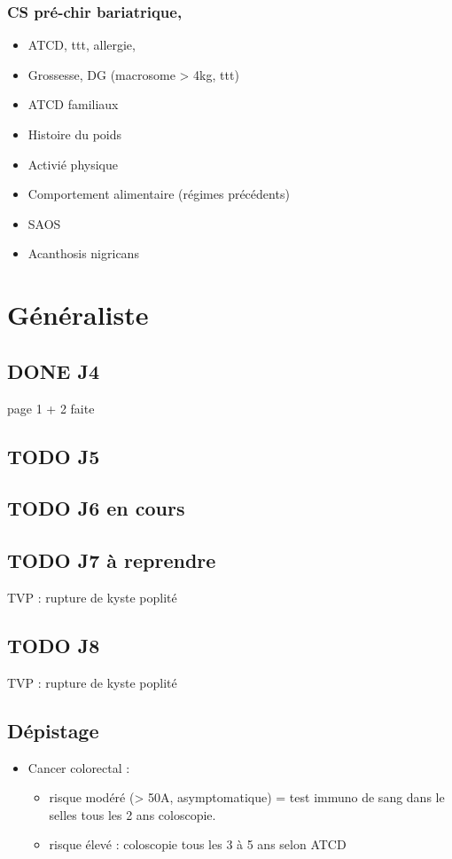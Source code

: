 \documentclass[11pt]{article}
\begin{document}
\subsubsection{CS pré-chir bariatrique,}
\label{sec:org0775185}
\begin{itemize}
\item ATCD, ttt, allergie,
\item Grossesse, DG (macrosome > 4kg, ttt)
\item ATCD familiaux
\item Histoire du poids
\item Activié physique
\item Comportement alimentaire (régimes précédents)
\item SAOS
\item Acanthosis nigricans
\end{itemize}
\section{Généraliste}
\label{sec:org47553ba}
\subsection{{\bfseries\sffamily DONE} J4}
\label{sec:orgdef581a}
page 1 + 2 faite
\subsection{{\bfseries\sffamily TODO} J5}
\label{sec:org888397b}
\subsection{{\bfseries\sffamily TODO} J6 en cours}
\label{sec:org81d060b}
\subsection{{\bfseries\sffamily TODO} J7  à reprendre}
\label{sec:org717eee4}
TVP : rupture de kyste poplité
\subsection{{\bfseries\sffamily TODO} J8}
\label{sec:orga7584c4}
TVP : rupture de kyste poplité
\subsection{Dépistage}
\label{sec:orgd063109}
\begin{itemize}
\item Cancer colorectal : 
\begin{itemize}
\item risque modéré (> 50A, asymptomatique) = test immuno de sang dans le selles tous les 2 ans \textpm{} coloscopie.
\item risque élevé : coloscopie tous les 3 à 5 ans selon ATCD
\end{itemize}
\end{itemize}
\end{document}

